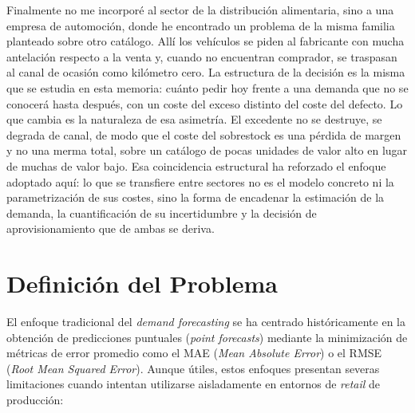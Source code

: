 Finalmente no me incorporé al sector de la distribución alimentaria, sino a una empresa de
automoción, donde he encontrado un problema de la misma familia planteado sobre otro catálogo. Allí
los vehículos se piden al fabricante con mucha antelación respecto a la venta y, cuando no encuentran
comprador, se traspasan al canal de ocasión como kilómetro cero. La estructura de la decisión es la
misma que se estudia en esta memoria: cuánto pedir hoy frente a una demanda que no se conocerá
hasta después, con un coste del exceso distinto del coste del defecto. Lo que cambia es la
naturaleza de esa asimetría. El excedente no se destruye, se degrada de canal, de modo que el coste
del sobrestock es una pérdida de margen y no una merma total, sobre un catálogo de pocas unidades de valor alto en
lugar de muchas de valor bajo. Esa coincidencia estructural ha reforzado el enfoque adoptado aquí: lo
que se transfiere entre sectores no es el modelo concreto ni la parametrización de sus costes, sino
la forma de encadenar la estimación de la demanda, la cuantificación de su incertidumbre y la
decisión de aprovisionamiento que de ambas se deriva.

\section{Definición del Problema}
El enfoque tradicional del \textit{demand forecasting} se ha centrado históricamente en la obtención de predicciones puntuales (\textit{point forecasts}) mediante la minimización de métricas de error promedio como el MAE (\textit{Mean Absolute Error}) o el RMSE (\textit{Root Mean Squared Error}). Aunque útiles, estos enfoques presentan severas limitaciones cuando intentan utilizarse aisladamente en entornos de \textit{retail} de producción:

